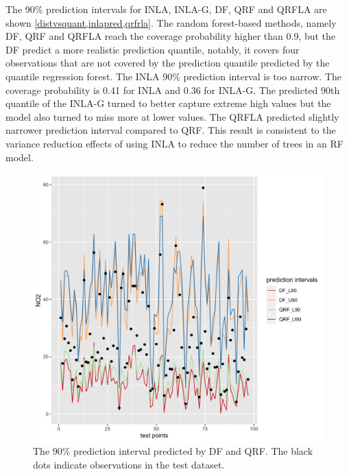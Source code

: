 \documentclass{article}
\begin{document}
The 90\% prediction intervals for INLA, INLA-G, DF, QRF and QRFLA are shown \cref{distvsquant,inlapred,qrfrla}. The random forest-based methods, namely DF, QRF and QRFLA reach the coverage probability higher than 0.9, but the DF predict a more realistic prediction quantile, notably, it covers four observations that are not covered by the prediction quantile predicted by the quantile regression forest. The INLA 90\% prediction interval is too narrow. The coverage probability is 0.41 for INLA and 0.36 for INLA-G. The predicted 90th quantile of the INLA-G turned to better capture extreme high values but the model also turned to miss more at lower values. The QRFLA predicted slightly narrower prediction interval compared to QRF. This result is consistent to the variance reduction effects of using INLA to reduce the number of trees in an RF model. 

\label{sec:predinterval}
\begin{figure}
\centering
\includegraphics[scale = 0.2]{fig/qrf_df.png}
\caption{The 90\% prediction interval predicted by DF and QRF. The black dots indicate observations in the test dataset.}
\label{distvsquant}
\end{figure}
\end{document}
